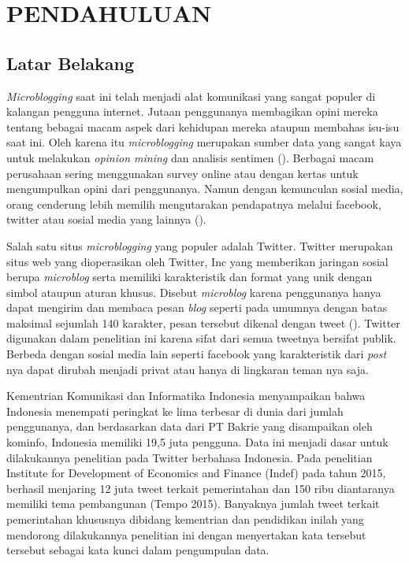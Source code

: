 \section*{PENDAHULUAN} %
\subsection*{Latar Belakang}


\textit{Microblogging} saat ini telah menjadi alat komunikasi yang sangat populer di kalangan pengguna internet. Jutaan penggunanya membagikan opini mereka tentang bebagai macam aspek dari kehidupan mereka ataupun membahas isu-isu saat ini. Oleh karena itu \textit{microblogging} merupakan sumber data yang sangat kaya untuk melakukan \textit{opinion mining} dan analisis sentimen \citeauthor{PAK10.385} (\cite*{PAK10.385}). Berbagai macam perusahaan sering menggunakan survey online atau dengan kertas untuk mengumpulkan opini dari penggunanya. Namun dengan kemunculan sosial media, orang cenderung lebih memilih mengutarakan pendapatnya melalui facebook, twitter atau sosial media yang lainnya (\cite{AnwarHridoy2015}).

Salah satu situs \textit{microblogging} yang populer adalah Twitter. Twitter merupakan situs web yang dioperasikan oleh Twitter, Inc yang memberikan jaringan sosial berupa \textit{microblog} serta memiliki karakteristik dan format yang unik dengan simbol ataupun aturan khusus. Disebut \textit{microblog} karena penggunanya hanya dapat mengirim dan membaca pesan \textit{blog} seperti pada umumnya dengan batas maksimal sejumlah 140 karakter, pesan tersebut dikenal dengan tweet (\cite{ZHANG2011}). Twitter digunakan dalam penelitian ini karena sifat dari semua tweetnya bersifat publik. Berbeda dengan sosial media lain seperti facebook yang karakteristik dari \textit{post} nya dapat dirubah menjadi privat atau hanya di lingkaran teman nya saja.

Kementrian Komunikasi dan Informatika Indonesia menyampaikan bahwa Indonesia menempati peringkat ke lima terbesar di dunia dari jumlah penggunanya, dan berdasarkan data dari PT Bakrie yang disampaikan oleh kominfo, Indonesia memiliki 19,5 juta pengguna. Data ini menjadi dasar untuk dilakukannya penelitian pada Twitter berbahasa Indonesia. Pada penelitian Institute for Development of Economics and Finance (Indef) pada tahun 2015, berhasil menjaring 12 juta tweet terkait pemerintahan dan 150 ribu diantaranya memiliki tema pembangunan (Tempo 2015). Banyaknya jumlah tweet terkait pemerintahan khususnya dibidang kementrian dan pendidikan inilah yang mendorong dilakukannya penelitian ini dengan menyertakan kata tersebut tersebut sebagai kata kunci dalam pengumpulan data.

